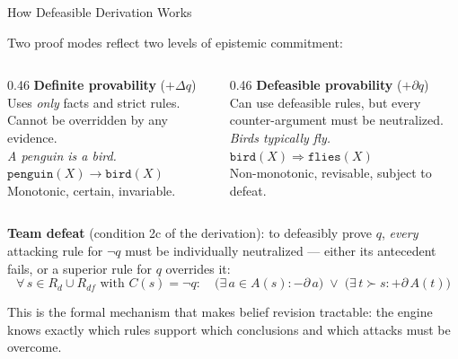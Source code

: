 \documentclass[aspectratio=169]{beamer}
\newcommand{\defto}{\Rightarrow}
\newcommand{\strictto}{\rightarrow}
\begin{document}
\begin{frame}{How Defeasible Derivation Works}

\small
Two proof modes reflect two levels of epistemic commitment:

\vspace{0.3em}
\begin{columns}[T]
\begin{column}{0.46\textwidth}
\textbf{\textcolor{defabblue}{Definite provability}} ($+\Delta q$)\\[3pt]
\footnotesize
Uses \textit{only} facts and strict rules.\\[2pt]
Cannot be overridden by any evidence.\\[4pt]
\textit{A penguin is a bird.}\\[2pt]
$\texttt{penguin}(X) \strictto \texttt{bird}(X)$\\[4pt]
\small Monotonic, certain, invariable.
\end{column}
\begin{column}{0.46\textwidth}
\textbf{\textcolor{defabgold}{Defeasible provability}} ($+\partial q$)\\[3pt]
\footnotesize
Can use defeasible rules, but every\\counter-argument must be neutralized.\\[4pt]
\textit{Birds typically fly.}\\[2pt]
$\texttt{bird}(X) \defto \texttt{flies}(X)$\\[4pt]
\small Non-monotonic, revisable, subject to defeat.
\end{column}
\end{columns}

\vspace{0.5em}
\textbf{Team defeat} (condition 2c of the derivation): to defeasibly prove $q$, \textit{every} attacking rule for $\neg q$ must be individually neutralized --- either its antecedent fails, or a superior rule for $q$ overrides it:
\vspace{-0.2em}
\[
\forall\, s \in R_d \cup R_{df} \text{ with } C(s) = \neg q: \quad
\bigl(\exists\, a \in A(s)\!: -\partial\, a\bigr)
\;\lor\;
\bigl(\exists\, t \succ s\!: +\partial\, A(t)\bigr)
\]

\vspace{-0.3em}
\footnotesize
This is the formal mechanism that makes belief revision tractable: the engine knows exactly which rules support which conclusions and which attacks must be overcome.
\end{frame}
\end{document}
